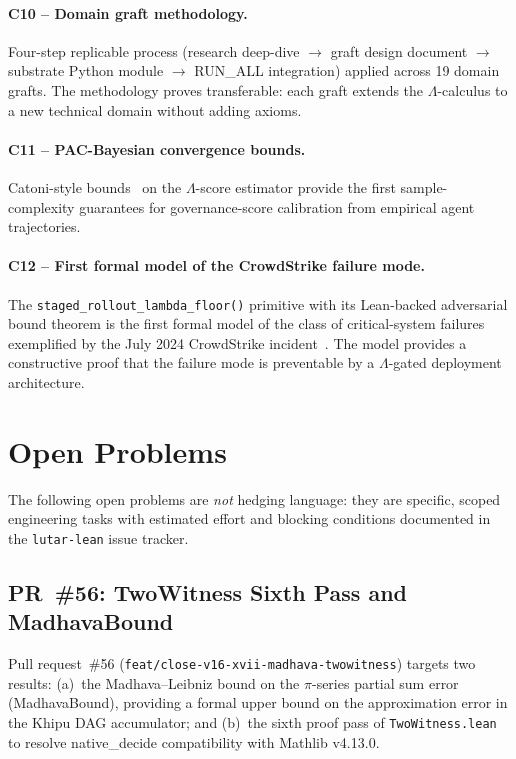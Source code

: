 \paragraph{C10 -- Domain graft methodology.}
Four-step replicable process (research deep-dive \(\to\) graft design
document \(\to\) substrate Python module \(\to\) RUN\_ALL integration)
applied across 19 domain grafts.
The methodology proves transferable: each graft extends the
\(\Lambda\)-calculus to a new technical domain without adding axioms.

\paragraph{C11 -- PAC-Bayesian convergence bounds.}
Catoni-style bounds~\cite{catoni2007pac} on the \(\Lambda\)-score
estimator provide the first sample-complexity guarantees for governance-score
calibration from empirical agent trajectories.

\paragraph{C12 -- First formal model of the CrowdStrike failure mode.}
The \texttt{staged\_rollout\_lambda\_floor()} primitive with its Lean-backed
adversarial bound theorem is the first formal model of the class of
critical-system failures exemplified by the July 2024 CrowdStrike
incident~\cite{crowdstrike2024incident}.
The model provides a constructive proof that the failure mode is
preventable by a \(\Lambda\)-gated deployment architecture.


\section{Open Problems}
\label{sec:openproblems}

The following open problems are \emph{not} hedging language: they are
specific, scoped engineering tasks with estimated effort and blocking
conditions documented in the \texttt{lutar-lean} issue tracker.

\subsection{PR~\#56: TwoWitness Sixth Pass and MadhavaBound}
\label{ssec:pr56}

Pull request~\#56 (\texttt{feat/close-v16-xvii-madhava-twowitness}) targets
two results: (a)~the Madhava--Leibniz bound on the \(\pi\)-series partial
sum error (MadhavaBound), providing a formal upper bound on the
approximation error in the Khipu DAG accumulator; and (b)~the sixth
proof pass of \texttt{TwoWitness.lean} to resolve native\_decide
compatibility with Mathlib v4.13.0.

